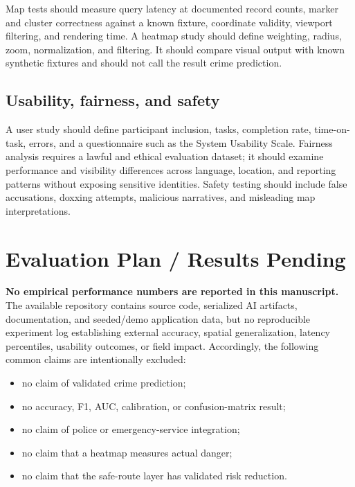 \documentclass[11pt]{article}
\begin{document}
Map tests should measure query latency at documented record counts, marker
and cluster correctness against a known fixture, coordinate validity,
viewport filtering, and rendering time. A heatmap study should define
weighting, radius, zoom, normalization, and filtering. It should compare
visual output with known synthetic fixtures and should not call the result
crime prediction.

\subsection{Usability, fairness, and safety}

A user study should define participant inclusion, tasks, completion rate,
time-on-task, errors, and a questionnaire such as the System Usability
Scale. Fairness analysis requires a lawful and ethical evaluation dataset;
it should examine performance and visibility differences across language,
location, and reporting patterns without exposing sensitive identities.
Safety testing should include false accusations, doxxing attempts,
malicious narratives, and misleading map interpretations.

\section{Evaluation Plan / Results Pending}
\label{sec:results}

\textbf{No empirical performance numbers are reported in this manuscript.}
The available repository contains source code, serialized AI artifacts,
documentation, and seeded/demo application data, but no reproducible
experiment log establishing external accuracy, spatial generalization,
latency percentiles, usability outcomes, or field impact. Accordingly, the
following common claims are intentionally excluded:
\begin{itemize}
  \item no claim of validated crime prediction;
  \item no accuracy, F1, AUC, calibration, or confusion-matrix result;
  \item no claim of police or emergency-service integration;
  \item no claim that a heatmap measures actual danger;
  \item no claim that the safe-route layer has validated risk reduction.
\end{itemize}
\end{document}
